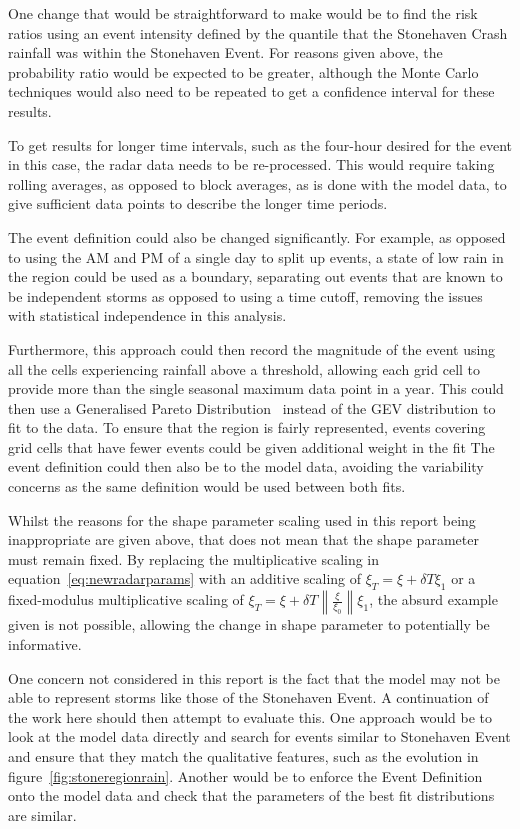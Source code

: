 One change that would be straightforward to make would be to find the risk ratios
    using an event intensity defined by the quantile that the Stonehaven Crash rainfall was within the Stonehaven Event.
For reasons given above, the probability ratio would be expected to be greater,
    although the Monte Carlo techniques would also need to be repeated to get a confidence interval for these results.

To get results for longer time intervals,
    such as the four-hour desired for the event in this case,
    the radar data needs to be re-processed.
This would require taking rolling averages,
    as opposed to block averages,
    as is done with the model data,
    to give sufficient data points to describe the longer time periods.

The event definition could also be changed significantly.
For example,
    as opposed to using the AM and PM of a single day to split up events,
    a state of low rain in the region could be used as a boundary,
    separating out events that are known to be independent storms as opposed to using a time cutoff,
    removing the issues with statistical independence in this analysis.

Furthermore,
    this approach could then record the magnitude of the event using all the cells experiencing rainfall above a threshold,
    allowing each grid cell to provide more than the single seasonal maximum data point in a year.
This could then use a Generalised Pareto Distribution~\cite{Coles_2001} instead of the GEV distribution to fit to the data.
To ensure that the region is fairly represented,
    events covering grid cells that have fewer events could be given additional weight in the fit
The event definition could then also be to the model data,
    avoiding the variability concerns as the same definition would be used between both fits.

Whilst the reasons for the shape parameter scaling used in this report being inappropriate are given above,
    that does not mean that the shape parameter must remain fixed.
By replacing the multiplicative scaling in equation~\ref{eq:newradarparams} with an additive scaling of
    $\xi_T = \xi + \delta T \xi_1$ or a fixed-modulus multiplicative scaling of $\xi_T = \xi + \delta T \left\| \frac{\xi}{\xi_0} \right\| \xi_1$,
    the absurd example given is not possible,
    allowing the change in shape parameter to potentially be informative.

One concern not considered in this report is the fact that the model may not be able to represent storms like those of the Stonehaven Event.
A continuation of the work here should then attempt to evaluate this.
One approach would be to look at the model data directly and
    search for events similar to Stonehaven Event and ensure that they match the qualitative features,
    such as the evolution in figure~\ref{fig:stoneregionrain}.
Another would be to enforce the Event Definition onto the model data and check that the parameters of the best fit distributions are similar.

